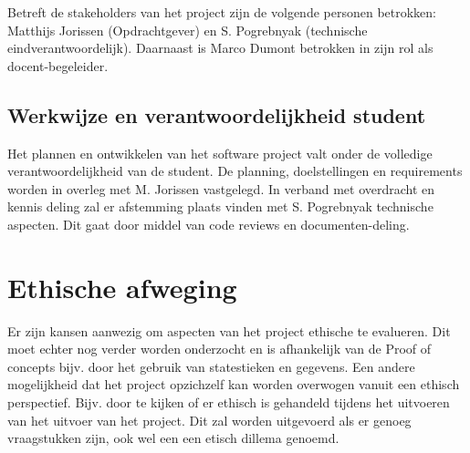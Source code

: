     Betreft de stakeholders van het project zijn de volgende personen betrokken: Matthijs Jorissen (Opdrachtgever) en  S. Pogrebnyak (technische eindverantwoordelijk). Daarnaast is Marco Dumont betrokken in zijn rol als docent-begeleider.

    \subsection{Werkwijze en verantwoordelijkheid student}

    Het plannen en ontwikkelen van het software project valt onder de volledige verantwoordelijkheid van de student. De planning, doelstellingen en requirements worden in overleg met M. Jorissen vastgelegd. In verband met overdracht en kennis deling zal er afstemming plaats vinden met S. Pogrebnyak technische aspecten. Dit gaat door middel van code reviews en documenten-deling.

\clearpage

\section{Ethische afweging} %

Er zijn kansen aanwezig om aspecten van het project ethische te evalueren. Dit moet echter nog verder worden onderzocht en is afhankelijk van de Proof of concepts bijv. door het gebruik van statestieken en gegevens. Een andere mogelijkheid dat het project opzichzelf kan worden overwogen vanuit een ethisch perspectief. Bijv. door te kijken of er ethisch is gehandeld tijdens het uitvoeren van het uitvoer van het project. Dit zal worden uitgevoerd als er genoeg vraagstukken zijn, ook wel een een etisch dillema genoemd.